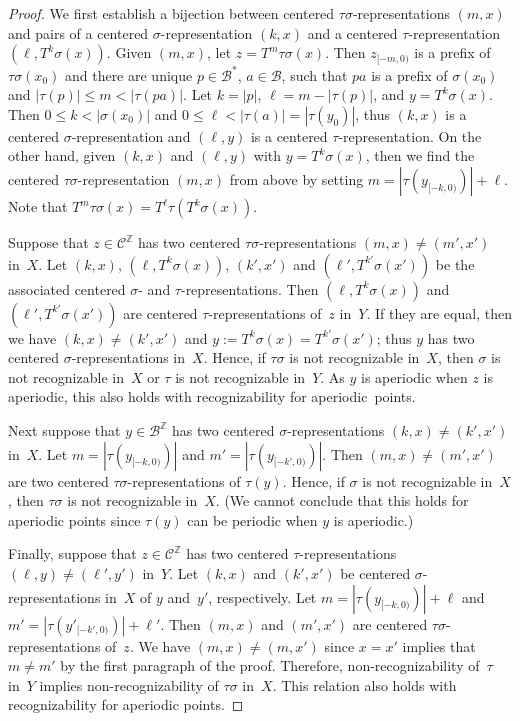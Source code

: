 \documentclass{amsart}
\theoremstyle{definition}
\theoremstyle{remark}
\numberwithin{equation}{section}
\begin{document}
\begin{proof}
We first establish a bijection between centered $\tau \sigma$-representations $(m,x)$ and pairs of a centered $\sigma$-representation $(k,x)$ and a centered $\tau$-representation $(\ell,T^k \sigma(x))$.
Given $(m,x)$, let $z = T^m \tau \sigma(x)$. 
Then $z_{[-m,0)}$ is a prefix of $\tau \sigma(x_0)$ and there are unique $p \in \mathcal{B}^*$,  $a \in \mathcal{B}$, such that $pa$ is a prefix of $\sigma(x_0)$ and $|\tau(p)| \le m < |\tau(pa)|$.
Let $k = |p|$, $\ell = m-|\tau(p)|$, and $y = T^k\sigma(x)$. 
Then $0 \le k < |\sigma(x_0)|$ and $0 \le \ell < |\tau(a)| = |\tau(y_0)|$, thus $(k,x)$ is a centered $\sigma$-representation and $(\ell,y)$ is a centered $\tau$-representation.
On the other hand, given $(k,x)$ and $(\ell,y)$ with $y = T^k \sigma(x)$, then we find the centered $\tau \sigma$-representation $(m,x)$ from above by setting $m = |\tau(y_{[-k,0)})| + \ell$.
Note that $T^m \tau \sigma(x) = T^\ell \tau(T^k\sigma(x))$.

Suppose that $z \in \mathcal{C}^\mathbb{Z}$ has two centered $\tau \sigma$-representations $(m,x) \ne (m',x')$ in~$X$. 
Let $(k,x)$, $(\ell,T^k \sigma(x))$, $(k',x')$ and $(\ell',T^{k'} \sigma(x'))$ be the associated centered $\sigma$- and $\tau$-representations.
Then $(\ell,T^k \sigma(x))$ and $(\ell',T^{k'} \sigma(x'))$ are centered $\tau$-representations of~$z$ in~$Y$.
If they are equal, then we have $(k,x) \ne (k',x')$ and $y:=T^k \sigma(x) = T^{k'} \sigma(x')$; thus $y$  has two centered $\sigma$-representations in~$X$.
Hence, if $\tau \sigma$ is not recognizable in~$X$, then $\sigma$ is not recognizable in~$X$ or $\tau$ is not recognizable in~$Y$.
As $y$ is aperiodic when $z$ is aperiodic, this also holds with recognizability for aperiodic~points.

Next suppose that $y \in \mathcal{B}^\mathbb{Z}$ has two centered $\sigma$-representations $(k,x) \ne (k',x')$ in~$X$. 
Let $m = |\tau(y_{[-k,0)})|$ and $m' = |\tau(y_{[-k',0)})|$. 
Then $(m,x) \ne (m',x')$ are two centered $\tau \sigma$-representations of $\tau(y)$. 
Hence, if $\sigma$ is not recognizable in~$X$, then $\tau \sigma$ is not recognizable in~$X$. 
(We cannot conclude that this holds for aperiodic points since $\tau(y)$ can be periodic when $y$ is aperiodic.)

Finally, suppose that $z \in \mathcal{C}^\mathbb{Z}$ has two centered $\tau$-representations $(\ell,y) \ne (\ell',y')$ in~$Y$. 
Let $(k,x)$ and $(k',x')$ be centered $\sigma$-representations in~$X$ of $y$ and~$y'$, respectively.
Let $m = |\tau(y_{[-k,0)})|+\ell$ and $m' = |\tau(y'_{[-k',0)})|+\ell'$. 
Then $(m,x)$ and $(m',x')$ are centered $\tau \sigma$-representations of~$z$.
We have $(m,x) \ne (m,x')$ since $x = x'$ implies that $m \ne m'$ by the first paragraph of the proof.
Therefore, non-recognizability of~$\tau$ in~$Y$ implies non-recognizability of $\tau \sigma$ in~$X$.
This relation also holds with recognizability for aperiodic points. 
\end{proof}
\end{document}
